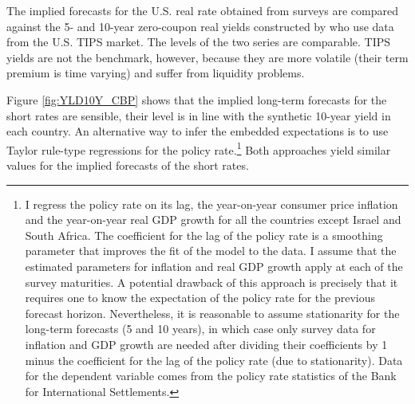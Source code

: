 {The implied forecasts for the U.S. real rate obtained from surveys are compared against the 5- and 10-year zero-coupon real yields constructed by \cite{GSW:2010} who use data from the U.S. TIPS market.
The levels of the two series are comparable. 
TIPS yields are not the benchmark, however, because they are more volatile (their term premium is time varying) and suffer from liquidity problems.


Figure \ref{fig:YLD10Y_CBP} shows that the implied long-term forecasts for the short rates are sensible, their level is in line with the synthetic 10-year yield in each country.
An alternative way to infer the embedded expectations is to use Taylor rule-type regressions for the policy rate.\footnote{ I regress the policy rate on its lag, the year-on-year consumer price inflation and the year-on-year real GDP growth for all the countries except Israel and South Africa. The coefficient for the lag of the policy rate is a smoothing parameter that improves the fit of the model to the data. I assume that the estimated parameters for inflation and real GDP growth apply at each of the survey maturities. A potential drawback of this approach is precisely that it requires one to know the expectation of the policy rate for the previous forecast horizon. Nevertheless, it is reasonable to assume stationarity for the long-term forecasts (5 and 10 years), in which case only survey data for inflation and GDP growth are needed after dividing their coefficients by 1 minus the coefficient for the lag of the policy rate (due to stationarity). Data for the dependent variable comes from the policy rate statistics of the Bank for International Settlements.}
Both approaches yield similar values for the implied forecasts of the short rates. %

}
